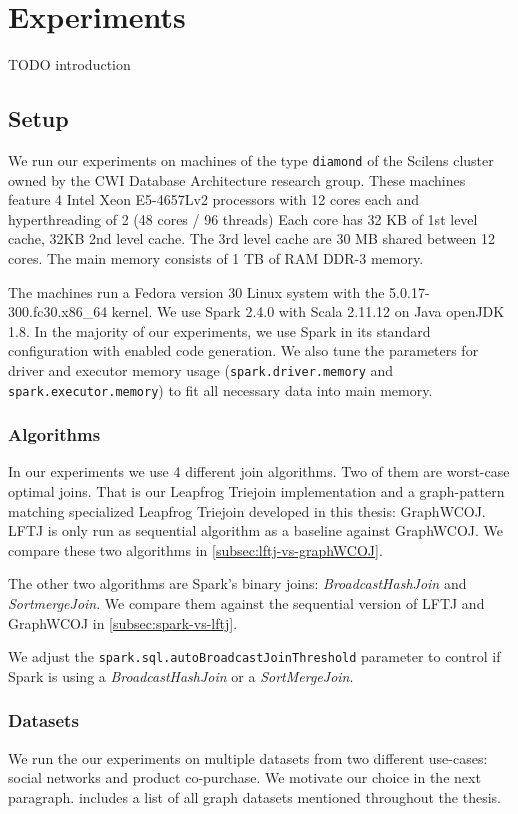 \section{Experiments}\label{sec:experiments}

TODO introduction

\subsection{Setup}

We run our experiments on machines of the type \texttt{diamond} of the Scilens cluster owned by the CWI Database Architecture research
group.
These machines feature 4 Intel Xeon E5-4657Lv2 processors with 12 cores each and hyperthreading of 2 (48 cores / 96 threads)
Each core has 32 KB of 1st level cache, 32KB 2nd level cache.
The 3rd level cache are 30 MB shared between 12 cores.
The main memory consists of 1 TB of RAM DDR-3 memory.

The machines run a Fedora version 30 Linux system with the 5.0.17-300.fc30.x86\_64 kernel.
We use Spark 2.4.0 with Scala 2.11.12 on Java openJDK 1.8.
In the majority of our experiments, we use Spark in its standard configuration with enabled code generation.
We also tune the parameters for driver and executor memory usage (\texttt{spark.driver.memory} and \texttt{spark.executor.memory}) to fit
all necessary data into main memory.

\subsubsection{Algorithms}

In our experiments we use 4 different join algorithms.
Two of them are worst-case optimal joins.
That is our Leapfrog Triejoin implementation and a graph-pattern matching
specialized Leapfrog Triejoin developed in this thesis: Graph\textsc{WCOJ}.
LFTJ is only run as sequential algorithm as a baseline against GraphWCOJ.
We compare these two algorithms in \cref{subsec:lftj-vs-graphWCOJ}.

The other two algorithms are Spark's binary joins: \textit{BroadcastHashJoin} and \textit{SortmergeJoin}.
We compare them against the sequential version of \textsc{LFTJ} and GraphWCOJ in \cref{subsec:spark-vs-lftj}.

We adjust the \texttt{spark.sql.autoBroadcastJoinThreshold} parameter to control
if Spark is using a \textit{BroadcastHashJoin} or a \textit{SortMergeJoin}.

\subsubsection{Datasets}
We run the our experiments on multiple datasets from two different use-cases: social networks and product co-purchase.
We motivate our choice in the next paragraph.
 includes a list of all graph datasets mentioned throughout the thesis.

